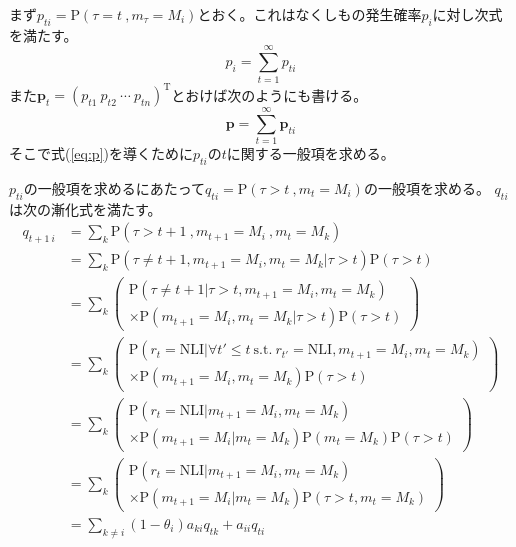 \documentclass{jarticle}
\numberwithin{equation}{section}
\numberwithin{table}{section}
\numberwithin{figure}{section}
\theoremstyle{plain}
\begin{document}
まず$ p_{t i} = \mathrm{P}(\tau = t\ , m_\tau = M_i) $とおく。これはなくしもの発生確率$p_i$に対し次式を満たす。
\begin{equation} \label{eq:pi=sum_pti}
    p_i = \sum_{t=1}^{\infty}p_{t i}
\end{equation}
また$ \bm{p}_{t} = (p_{t 1}\ p_{t 2}\ \cdots\ p_{t n})^\mathrm{T} $とおけば次のようにも書ける。
\begin{equation} \label{eq:p=sum_pt}
    \bm{p} = \sum_{t=1}^{\infty} \bm{p}_{t i}
\end{equation}
そこで式(\ref{eq:p})を導くために$ p_{t i} $の$t$に関する一般項を求める。

$ p_{t i} $の一般項を求めるにあたって$ q_{t i} = \mathrm{P}(\tau > t\ , m_t=M_i) $の一般項を求める。
$ q_{t i} $は次の漸化式を満たす。
\begin{align}
    q_{t+1\ i} & = \! \sum_{k} \mathrm{P}(\tau \! > \! t + 1\ , m_{t+1} \! = \! M_i\ , m_t \! = \! M_k) \nonumber\\
    & = \! \sum_{k} \mathrm{P}(\tau \! \ne \! t + 1 , m_{t+1} \! = \! M_i , m_t \! = \! M_k | \tau \! > \! t) \mathrm{P}(\tau \! > \! t) \nonumber\\
    & = \! \sum_{k} \left(
        \begin{array}{l}
            \mathrm{P}(\tau \! \ne \! t + 1 | \tau \! > \! t , m_{t+1} \! = \! M_i , m_t \! = \! M_k) \\
            \times \mathrm{P}(m_{t+1} \! = \! M_i , m_t \! = \! M_k | \tau \! > \! t) \mathrm{P}(\tau \! > \! t)
        \end{array}
     \right) \nonumber\\
    & = \! \sum_{k} \left(
        \begin{array}{l}
            \mathrm{P}(r_t \! = \! \mathrm{NLI} | \forall t' \! \le \! t \ \mathrm{s.t.}\ r_{t'}\! =\!\mathrm{NLI} , m_{t+1} \! = \! M_i , m_t \! = \! M_k) \\
            \times \mathrm{P}(m_{t+1} \! = \! M_i , m_t \! = \! M_k) \mathrm{P}(\tau \! > \! t)
        \end{array}
    \right) \nonumber\\
    & = \! \sum_{k} \left(
        \begin{array}{l}
            \mathrm{P}(r_t \! = \! \mathrm{NLI} | m_{t+1} \! = \! M_i , m_t \! = \! M_k) \\
            \times \mathrm{P}(m_{t+1} \! = \! M_i | m_t \! = \! M_k) \mathrm{P}(m_t \! = \! M_k) \mathrm{P}(\tau \! > \! t)
        \end{array}
    \right) \nonumber\\
    & = \! \sum_{k} \left(
        \begin{array}{l}
            \mathrm{P}(r_t \! = \! \mathrm{NLI} | m_{t+1} \! = \! M_i , m_t \! = \! M_k) \\
            \times \mathrm{P}(m_{t+1} \! = \! M_i | m_t \! = \! M_k) \mathrm{P}(\tau \! > \! t , m_t \! = \! M_k)
        \end{array}
    \right) \nonumber\\
    & = \! \sum_{k \ne i} (1 - \theta_i) a_{k i} q_{t k} + a_{i i} q_{t i} \label{eq:qti_rec}
\end{align}
\end{document}
